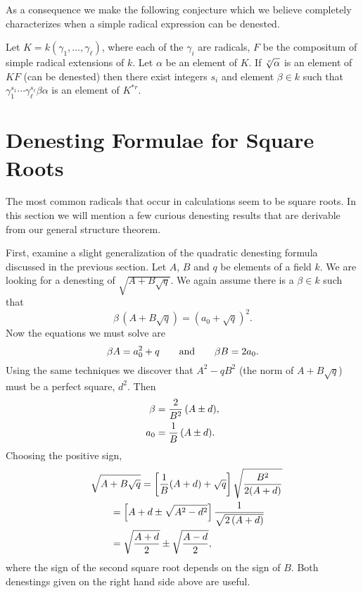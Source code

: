 As a consequence we make the following conjecture which we believe
completely characterizes when a simple radical expression can be
denested.

\begin{conjecture}
Let $K = k(\gamma_1, \ldots, \gamma_\ell)$, where each of the
$\gamma_i$ are radicals, $F$ be the compositum of simple radical
extensions of $k$.  Let $\alpha$ be an element of $K$.  If $\root r\of
\alpha$ is an element of $KF$ (can be denested) then there exist
integers $s_i$ and element $\beta\in k$ such that 
$\gamma_1^{s_1} \cdots \gamma_\ell^{s_\ell} \beta \alpha$ is an
element of $K^{\ast r}$. 
\end{conjecture}

\section{Denesting Formulae for Square Roots}
\label{Denesting:Square:Roots:Sec}

The most common radicals that occur in calculations seem to be square
roots.  In this section we will mention a few curious denesting results
that are derivable from our general structure theorem. 

First, examine a slight generalization of the quadratic denesting formula
discussed in the previous section.  Let $A$, $B$ and $q$ be elements of a
field $k$.  We are looking for a denesting of $\sqrt{A + B\sqrt{q}}$.  We
again assume there is a $\beta \in k$ such that
\[
\beta\, (A + B \sqrt{q}) = (a_0 + \sqrt{q})^2.
\]
Now the equations we must solve are
\[
\beta A = a_0^2 + q \qquad\hbox{and}\qquad \beta B = 2 a_0.
\]
Using the same techniques we discover that $A^2 - q B^2$ (the norm of 
$A + B \sqrt{q}$) must be a perfect square, $d^2$.  Then
\[
\begin{aligned}
\beta &= {2 \over B^2} \,(A \pm d),\\
a_0 &= {1 \over B} \,(A \pm d).
\end{aligned}
\]
Choosing the positive sign,
\begin{eqnarray*}
\lefteqn{\sqrt{A + B \sqrt{q}} = \left[{1 \over B} (A + d) + \sqrt{q}\right]
\sqrt{B^2 \over 2 (A + d)}} \\
&\qquad = \left[A + d \pm \sqrt{A^2 - d^2}\right] 
{1 \over \sqrt{2 \, (A + d)}}\\
&\qquad = \sqrt{A + d \over 2} \pm \sqrt{A - d \over 2},
\end{eqnarray*}
where the sign of the second square root depends on the sign of $B$.  Both
denestings given on the right hand side above are useful.

